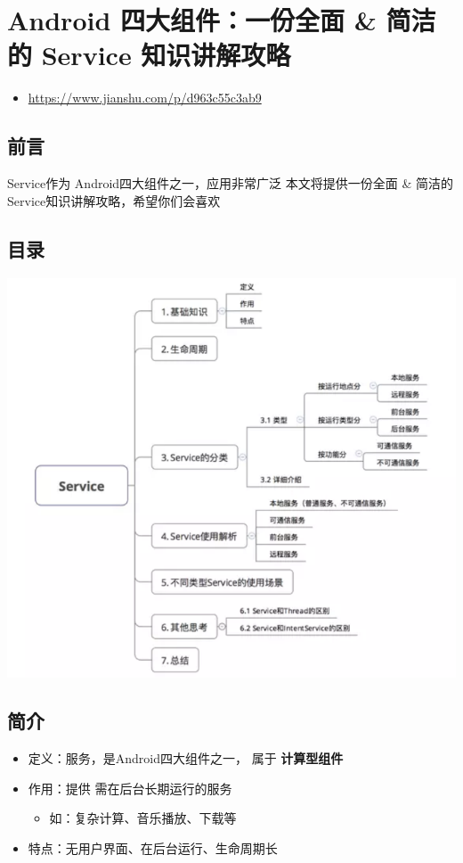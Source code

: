 \documentclass[9pt, b5paper]{article}
\begin{document}
\section{Android 四大组件：一份全面 \& 简洁的 Service 知识讲解攻略}
\label{sec-2}
\begin{itemize}
\item \url{https://www.jianshu.com/p/d963c55c3ab9}
\end{itemize}
\subsection{前言}
\label{sec-2-1}
Service作为 Android四大组件之一，应用非常广泛
本文将提供一份全面 \& 简洁的 Service知识讲解攻略，希望你们会喜欢
\subsection{目录}
\label{sec-2-2}

\includegraphics[width=1.3\linewidth]{./pic/service.png}
\subsection{简介}
\label{sec-2-3}
\begin{itemize}
\item 定义：服务，是Android四大组件之一， 属于 \textbf{计算型组件}
\item 作用：提供 需在后台长期运行的服务
\begin{itemize}
\item 如：复杂计算、音乐播放、下载等
\end{itemize}
\item 特点：无用户界面、在后台运行、生命周期长
\end{itemize}
\end{document}
